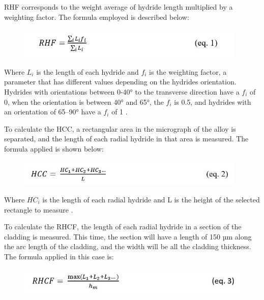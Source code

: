 \documentclass[12pt]{article}
\begin{document}
\noindent
RHF corresponds to the weight average of hydride length multiplied by a weighting factor. The formula employed is described below:

\begin{figure}[h] %
    \raggedleft
    \includegraphics[width=4.3in]{RHF.JPG}
    \label{fig:my_label}
\end{figure}


\noindent
Where $L_i$ is the length of each hydride and $f_i$ is the weighting factor, a parameter that has different values depending on the hydrides orientation. Hydrides with orientations between 0-40° to the transverse direction have a $f_i$ of 0, when the orientation is between 40° and 65°, the $f_i$ is 0.5, and hydrides with an orientation of 65–90° have a $f_i$ of 1 \cite{COLAS2013586}. 

\noindent
To calculate the HCC, a rectangular area in the micrograph of the alloy is separated, and the length of each radial hydride in that area is measured. The formula applied is shown below:


\begin{figure}[h] %
    \raggedleft
    \includegraphics[width=4.3in]{HCC.JPG}
    \label{fig:my_label}
\end{figure}
\noindent
Where $HC_i$ is the length of each radial hydride and L is the height of the selected rectangle to measure \cite{SIMON2021152817}.

\noindent
To calculate the RHCF, the length of each radial hydride in a section of the cladding is measured. This time, the section will have a length of 150 µm along the arc length of the cladding, and the width will be all the cladding thickness. The formula applied in this case is:

\begin{figure}[h] %
    \raggedleft
    \includegraphics[width=4.5in]{RHCF.JPG}
    \label{fig:my_label}
\end{figure}
\end{document}
